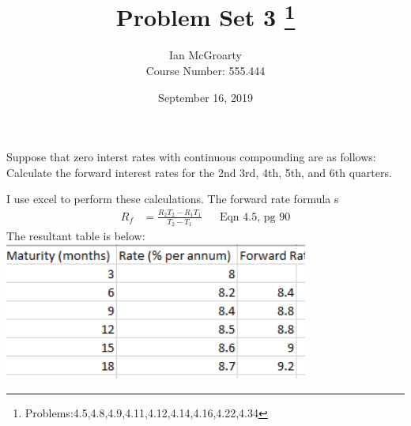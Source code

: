 \documentclass[12pt]{article}
\title{Problem Set 3 \thanks{Problems:4.5,4.8,4.9,4.11,4.12,4.14,4.16,4.22,4.34}}
\author{Ian McGroarty \\
	Course Number: 555.444}
\date{September 16, 2019}
\newenvironment{problem}[3][Problem]{\begin{trivlist}
\item[\hskip \labelsep {\bfseries #1}\hskip \labelsep {\bfseries #2.}]}{\end{trivlist}}
\begin{document}
\maketitle
\newpage
\begin{problem}{4.5}. Suppose that zero interst rates with continuous compounding are as follows: Calculate the forward interest rates for the 2nd 3rd, 4th, 5th, and 6th quarters. 

I use excel to perform these calculations. The forward rate formula s 
\begin{align*}
R_f &= \frac{R_2T_2 - R_1T_1}{T_2-T_1} && \text{Eqn 4.5, pg 90} 
\end{align*}
The resultant table is below: \\
\includegraphics[width=0.75\textwidth ]{mod3_p1.png}
  \end{problem}
\end{document}

